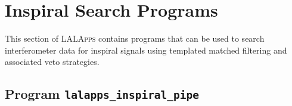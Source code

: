 
\clearpage

\section{Inspiral Search Programs}
\label{section:inspiral}

This section of \textsc{LALApps} contains programs that can be used to search
interferometer data for inspiral signals using templated matched filtering and
associated veto strategies.

\clearpage
\subsection{Program \texttt{lalapps\_inspiral\_pipe}}
\label{program:inspiral-pipeline}

